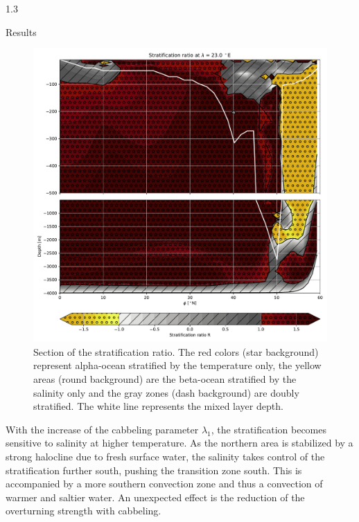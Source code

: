 \documentclass[final]{beamer}
\newlength{\colwidth}
\begin{document}
\begin{frame}[t]
\begin{columns}[t]
\begin{column}{1.3\colwidth}
\begin{alertblock}{Results}
\begin{minipage}{.6\textwidth}
\begin{figure}
        \includegraphics[width=\textwidth]{R_section}
        \caption{Section of the stratification ratio. The red colors (star background)
          represent alpha-ocean
          stratified by the temperature only,
          the yellow areas (round background) are the beta-ocean stratified
          by the salinity only and
          the gray zones (dash background) are doubly stratified.
          The white line represents the mixed layer depth.}
      \end{figure}

        With the increase of the cabbeling parameter $\lambda_1$, the stratification
        becomes sensitive to salinity at higher temperature.
        As the northern area is stabilized by a strong halocline due to
        fresh surface water, the salinity takes control of the stratification
        further south, pushing the transition zone south. This is accompanied
        by a more southern convection zone and thus a convection of warmer
        and saltier water.
        An unexpected effect is the reduction of the overturning strength
        with cabbeling.
    \end{minipage}
    
  \end{alertblock}

\end{column}


\end{columns}
\end{frame}
\end{document}
